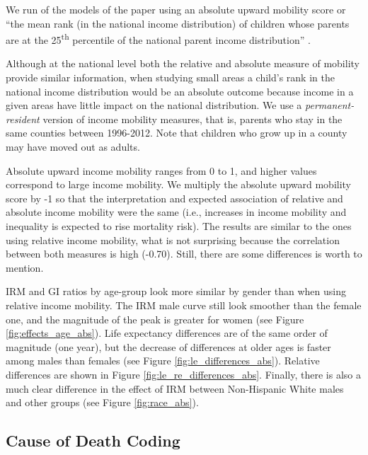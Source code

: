 \documentclass[11pt]{article}
\begin{document}
We run of the models of the paper using an absolute upward mobility score or ``the mean rank (in the national income distribution) of children whose parents are at the 25\textsuperscript{th} percentile of the national parent income distribution'' \citep[p. 7]{Chetty2014}.

Although at the national level both the relative and absolute measure of mobility provide similar information, when studying small areas a child's rank in the national income distribution would be an absolute outcome because income in a given areas have little impact on the national distribution. We use a \textit{permanent-resident} version of income mobility measures, that is, parents who stay in the same counties between 1996-2012. Note that children who grow up in a county may have moved out as adults.

Absolute upward income mobility ranges from 0 to 1, and higher values correspond to large income mobility. We multiply the absolute upward mobility score by -1 so that the interpretation and expected association of relative and absolute income mobility were the same (i.e., increases in  income mobility and inequality is expected to rise mortality risk). The results  are similar to the ones using relative income mobility, what is not surprising because the correlation between both measures is high (-0.70). Still, there are some differences is worth to mention. 

IRM and GI ratios by age-group look more similar by gender than when using relative income mobility. The IRM male curve still look smoother than the female one, and the magnitude of the peak is greater for women (see Figure \ref{fig:effects_age_abs}). Life expectancy differences are of the same order of magnitude (one year), but the decrease of differences at older ages is faster among males than females (see Figure \ref{fig:le_differences_abs}). Relative differences are shown in Figure \ref{fig:le_re_differences_abs}. Finally, there is also a much clear difference in the effect of IRM between Non-Hispanic White males and other groups (see Figure \ref{fig:race_abs}).



\newpage


\newpage


\clearpage


\newpage


\newpage


\newpage


\newpage


\newpage


\newpage


\clearpage
\subsection{Cause of Death Coding}


\end{document}

